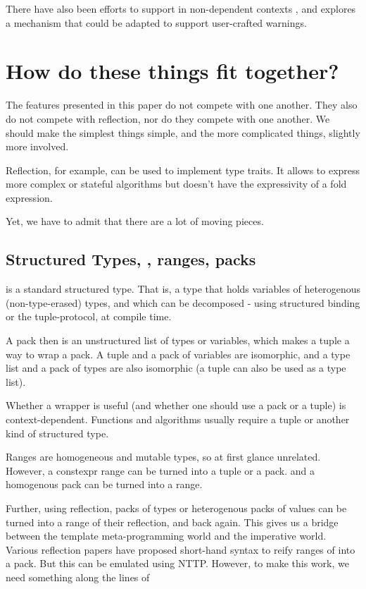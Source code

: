 \documentclass{wg21}
\begin{document}
There have also been efforts to support  in non-dependent contexts ,
and  explores a mechanism that could be adapted to support user-crafted warnings.


\section{How do these things fit together?}

The features presented in this paper do not compete with one another. They also do not compete with reflection, nor do they compete with one another. We should make the simplest things simple, and the more complicated things, slightly more involved.

Reflection, for example, can be used to implement type traits. It allows to express more complex or stateful algorithms but doesn't have the expressivity of a fold expression.

Yet, we have to admit that there are a lot of moving pieces.

\subsection{Structured Types, , ranges, packs}

 is a standard structured type. That is, a type that holds variables of heterogenous (non-type-erased) types,
and which can be decomposed - using structured binding or the tuple-protocol, at compile time.

A pack then is an unstructured list of types or variables, which makes a tuple a way to wrap a pack.
A tuple and a pack of variables are isomorphic, and a type list and a pack of types are also isomorphic (a tuple can also be used as a type list).

Whether a wrapper is useful (and whether one should use a pack or a tuple) is context-dependent.
Functions and algorithms usually require a tuple or another kind of structured type.

Ranges are homogeneous and mutable types, so at first glance unrelated.
However, a constexpr range can be turned into a tuple or a pack. and a homogenous pack can be turned into a range.

Further, using reflection, packs of types or heterogenous packs of values can be turned into a range of their reflection, and back again.
This gives us a bridge between the template meta-programming world and the imperative world.
Various reflection papers have proposed short-hand syntax to reify ranges of  into a pack.
But this can be emulated using NTTP.
However, to make this work, we need something along the lines of 
\end{document}
